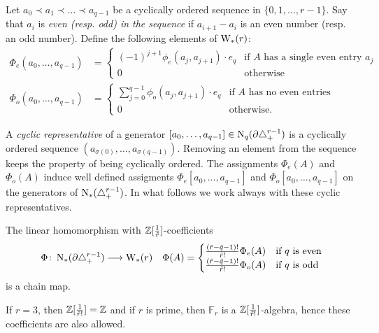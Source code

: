 Let $a_0\prec a_1\prec\ldots\prec a_{q-1}$ be a cyclically ordered sequence in $\{0,1,\ldots,r-1\}$. Say that $a_i$ is \emph{even (resp. \emph{odd}) in the sequence} if $a_{i+1}-a_i$ is an even number (resp. an odd number).
Define the following elements of $\mathrm{W}_*(r)$:
\begin{align*}
	\Phi_e(a_0,\ldots,a_{q-1}) &= \begin{cases}
		(-1)^{j+1}\phi_e(a_j,a_{j+1})\cdot e_q & \text{if $A$ has a single even entry $a_j$} \\
		0 & \text{otherwise}
	\end{cases}
	\\
	\Phi_o(a_0,\ldots,a_{q-1}) &= \begin{cases}
		\sum_{j=0}^{q-1} \phi_o(a_j,a_{j+1})\cdot e_q & \text{if $A$ has no even entries} \\
		0 & \text{otherwise.}
	\end{cases}
\end{align*}

A \emph{cyclic representative} of a generator $[a_0,\ldots,a_{q-1}]\in \operatorname{N}_q(\partial \triangle_{+}^{r-1})$ is a cyclically ordered sequence $(a_{\sigma(0)},\ldots,a_{\sigma(q-1)})$. Removing an element from the sequence keeps the property of being cyclically ordered. The assignments $\Phi_e(A)$ and $\Phi_o(A)$ induce well defined assigments $\Phi_e[a_0,\ldots,a_{q-1}]$ and $\Phi_o[a_0,\ldots,a_{q-1}]$ on the generators of $\operatorname{N}_*(\triangle_{+}^{r-1})$. In what follows we work always with these cyclic representatives.
\begin{theorem} The linear homomorphism with $\mathbb{Z}[\frac{1}{\tilde{r}}]$-coefficients
	\begin{align*}
		\Phi\colon \operatorname{N}_*(\partial \triangle_{+}^{r-1})&\longrightarrow \mathrm{W}_*(r)
		&
		\Phi(A) = \begin{cases}
			\frac{(\tilde{r}-\tilde{q}-1)!}{\tilde{r}!}\Phi_e(A) & \text{if $q$ is even} \\
			\frac{(\tilde{r}-\tilde{q}-1)!}{\tilde{r}!}\Phi_o(A) & \text{if $q$ is odd}
		\end{cases}
	\end{align*}
	is a chain map.
\end{theorem}

\begin{remark}
	If $r=3$, then $\mathbb{Z}[\frac{1}{\tilde{r}!}] = \mathbb{Z}$ and if $r$ is prime, then $\mathbb{F}_r$ is a $\mathbb{Z}[\frac{1}{\tilde{r}!}]$-algebra, hence these coefficients are also allowed.
\end{remark}

